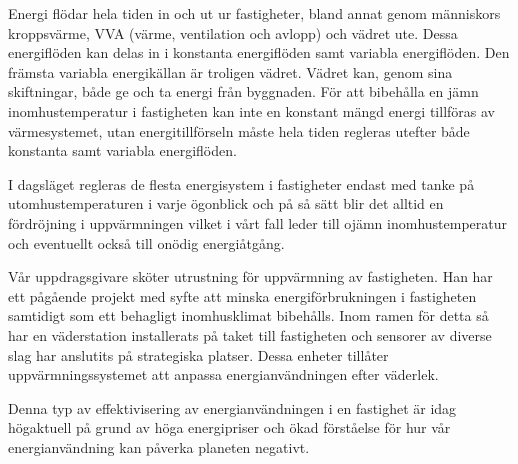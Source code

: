 Energi flödar hela tiden in och ut ur fastigheter, bland annat genom människors kroppsvärme, VVA (värme, ventilation och avlopp) och vädret ute. Dessa energiflöden kan delas in i konstanta energiflöden samt variabla energiflöden. Den främsta variabla energikällan är troligen vädret. Vädret kan, genom sina skiftningar, både ge och ta energi från byggnaden. För att bibehålla en jämn inomhustemperatur i fastigheten kan inte en konstant mängd energi tillföras av värmesystemet, utan energitillförseln måste hela tiden regleras utefter både konstanta samt variabla energiflöden.

I dagsläget regleras de flesta energisystem i fastigheter endast med tanke på utomhustemperaturen i varje ögonblick och på så sätt blir det alltid en fördröjning i uppvärmningen vilket i vårt fall leder till ojämn inomhustemperatur och eventuellt också till onödig energiåtgång.

Vår uppdragsgivare sköter utrustning för uppvärmning av fastigheten. Han har ett pågående projekt med syfte att minska energiförbrukningen i fastigheten samtidigt som ett behagligt inomhusklimat bibehålls. Inom ramen för detta så har en väderstation installerats på taket till fastigheten och sensorer av diverse slag har anslutits på strategiska platser.  Dessa enheter tillåter uppvärmningssystemet att anpassa energianvändningen efter väderlek.

Denna typ av effektivisering av energianvändningen i en fastighet är idag högaktuell på grund av höga energipriser och ökad förståelse för hur vår energianvändning kan påverka planeten negativt.